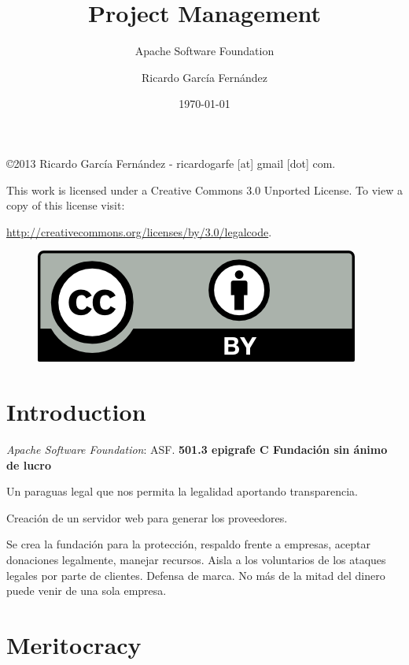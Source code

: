 \documentclass[11pt]{scrartcl}
\title{\textbf{Project Management}}
\subtitle{Apache Software Foundation}
\author{Ricardo Garc\'ia Fern\'andez}
\date{\today}
\begin{document}
\maketitle

\vfill

\begin{flushright}
    \copyright  2013 Ricardo Garc\'ia Fern\'andez - ricardogarfe [at] gmail [dot] com.

    This work is licensed under a Creative Commons 3.0 Unported License.
    To view a copy of this license visit:
 
    \url{http://creativecommons.org/licenses/by/3.0/legalcode}.
\end{flushright}

\begin{figure}[h]
    \begin{flushright}	
        \includegraphics{by}
        \label{fig:by}
    \end{flushright}
\end{figure}

\newpage

\section{Introduction}

\emph{Apache Software Foundation}: ASF. \textbf{501.3 epigrafe C Fundación sin ánimo de lucro}

\par Un paraguas legal que nos permita la legalidad aportando transparencia.

\par Creación de un servidor web para generar los proveedores.

\par Se crea la fundación para la protección, respaldo frente a empresas, aceptar donaciones legalmente, manejar recursos. Aisla a los voluntarios de los ataques legales por parte de clientes. Defensa de marca. No más de la mitad del dinero puede venir de una sola empresa.

\section{Meritocracy}
\label{sec:meritocracy}
\end{document}
